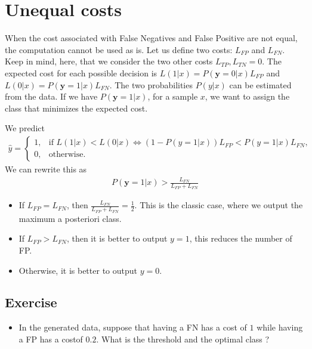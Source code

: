 \documentclass[letterpaper,10pt,english]{jupyterBook}
\begin{document}
\section{Unequal costs}
\label{\detokenize{06:unequal-costs}}
\sphinxAtStartPar
When the cost associated with False Negatives and False Positive are not equal, the computation cannot be used as is. Let us define two costs: \(L_{FP}\) and \(L_{FN}\). Keep in mind, here, that we consider the two other costs \(L_{TP}, L_{TN} = 0\). The expected cost for each possible decision is \(L(1|x) = P(\mathbf{y}=0|x)L_{FP}\) and \(L(0|x) = P(\mathbf{y}=1|x)L_{FN}\). The two  probabilities \(P(y|x)\) can be estimated from the data. If we have \(P(\mathbf{y}=1|x)\), for a sample \(x\), we want to assign the class that minimizes the expected cost.

\sphinxAtStartPar
We predict
\begin{equation*}
\begin{split}
\hat{y} =
\begin{cases} 
1, & \text{if } L(1|x) < L(0|x) \Leftrightarrow (1 - P(y=1|x)) L_{FP} < P(y=1|x) L_{FN}, \\
0, & \text{otherwise}.
\end{cases}
\end{split}
\end{equation*}
\sphinxAtStartPar
We can rewrite this as
\begin{equation*}
\begin{split}P(\mathbf{y}=1|x) > \frac{L_{FN}}{L_{FP}+L_{FN}}\end{split}
\end{equation*}\begin{itemize}
\item {} 
\sphinxAtStartPar
If \(L_{FP} = L_{FN}\), then \(\frac{L_{FN}}{L_{FP}+L_{FN}} = \frac12\). This is the classic case, where we output the maximum a posteriori class.

\item {} 
\sphinxAtStartPar
If \(L_{FP} > L_{FN}\), then it is better to output \(y=1\), this reduces the number of FP.

\item {} 
\sphinxAtStartPar
Otherwise, it is better to output \(y=0\).

\end{itemize}


\subsection{Exercise}
\label{\detokenize{06:id2}}\begin{itemize}
\item {} 
\sphinxAtStartPar
In the generated data, suppose that having a FN has a cost of \(1\) while having a FP has a costof \(0.2\). What is the threshold and the optimal class ?

\end{itemize}
\end{document}
